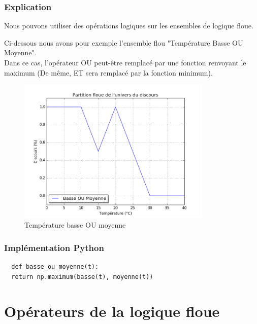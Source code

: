 \documentclass[a4paper]{article}
\begin{document}
\subsubsection{Explication}
Nous pouvons utiliser des opérations logiques sur les ensembles de logique floue.

Ci-dessous nous avons pour exemple l'ensemble flou "Température Basse OU Moyenne".\\
Dans ce cas, l'opérateur OU peut-être remplacé par une fonction renvoyant le maximum (De même, ET sera remplacé par la fonction minimum).

\begin{figure}[h]
\begin{center}
	\includegraphics[width=350px]{plot_basse_ou_moyenne.png}
\end{center}
\caption{Température basse OU moyenne}
\end{figure}

\subsubsection{Implémentation Python}

\begin{lstlisting}
  def basse_ou_moyenne(t):
  return np.maximum(basse(t), moyenne(t))
\end{lstlisting}


\clearpage

\section{Opérateurs de la logique floue}
\end{document}
